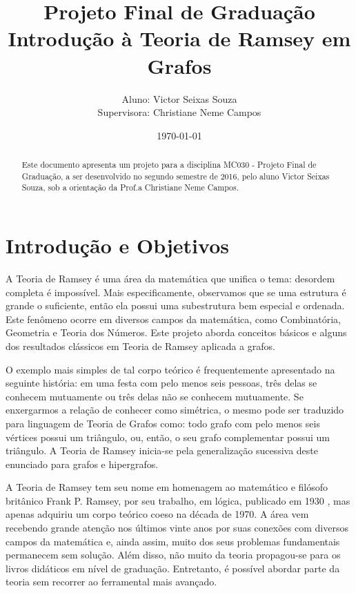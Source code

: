 \documentclass[a4paper,10pt]{article}
\author{Aluno: Victor Seixas Souza\\
Supervisora: Christiane Neme Campos
}
\date{\today}
\title{Projeto Final de Graduação\\
\Huge{Introdução à Teoria de Ramsey em Grafos}}
\begin{document}

\maketitle


\begin{abstract}
Este documento apresenta um projeto para a disciplina MC030 - Projeto Final de Graduação, a ser desenvolvido no segundo semestre de 2016, pelo aluno Victor Seixas Souza, sob a orientação da Prof.a Christiane Neme Campos.
\end{abstract}


\section{Introdução e Objetivos}

A Teoria de Ramsey é uma área da matemática que unifica o tema: desordem completa é impossível. Mais especificamente, observamos que se uma estrutura é grande o suficiente, então ela possui uma subestrutura bem especial e ordenada. Este fenômeno ocorre em diversos campos da matemática, como Combinatória, Geometria e Teoria dos Números. Este projeto aborda conceitos básicos e alguns dos resultados clássicos em Teoria de Ramsey aplicada a grafos.

O exemplo mais simples de tal corpo teórico é frequentemente apresentado na seguinte história: em uma festa com pelo menos seis pessoas, três delas se conhecem mutuamente ou três delas não se conhecem mutuamente. Se enxergarmos a relação de conhecer como simétrica, o mesmo pode ser traduzido para linguagem de Teoria de Grafos como: todo grafo com pelo menos seis vértices possui um triângulo, ou, então, o seu grafo complementar possui um triângulo. A Teoria de Ramsey inicia-se pela generalização sucessiva deste enunciado para grafos e hipergrafos.

A Teoria de Ramsey tem seu nome em homenagem ao matemático e filósofo britânico Frank P. Ramsey, por seu trabalho, em lógica, publicado em 1930 \cite{ramsey}, mas apenas adquiriu um corpo teórico coeso na década de 1970. A área vem recebendo grande atenção nos últimos vinte anos por suas conexões com diversos campos da matemática e, ainda assim, muito dos seus problemas fundamentais permanecem sem solução. Além disso, não muito da teoria propagou-se para os livros didáticos em nível de graduação. Entretanto, é possível abordar parte da teoria sem recorrer ao ferramental mais avançado.
\end{document}
